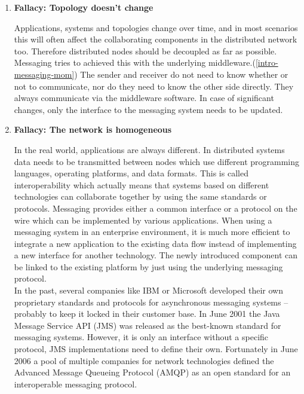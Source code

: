 \begin{enumerate}
{      }

    \item{\textbf{Fallacy: Topology doesn't change}

        Applications, systems and topologies change over time, and in most
        scenarios this will often affect the collaborating components in the
        distributed network too. Therefore distributed nodes should be decoupled
        as far as possible. Messaging tries to achieved this with the underlying
        middleware.(\ref{intro-messaging-mom}) The sender and receiver do not need
        to know whether or not to communicate, nor do they need to know the other 
        side directly. They always communicate via the middleware software. In 
        case of significant changes, only the interface to the messaging system 
        needs to be updated.

      }

    \item{\textbf{Fallacy: The network is homogeneous}

        In the real world, applications are always different. In distributed systems
        data needs to be transmitted between nodes which use different
        programming languages, operating platforms, and data formats.  This is
        called interoperability which actually means that systems based on
        different technologies can collaborate together by using the same
        standards or protocols. Messaging provides either a common interface or
        a protocol on the wire which can be implemented by various
        applications. When using a messaging system in an enterprise
        environment, it is much more efficient to integrate a new application to
        the existing data flow instead of implementing a new interface for
        another technology. The newly introduced component can be linked to the
        existing platform by just using the underlying messaging protocol.\\

        In the past, several companies like IBM or Microsoft developed their own
        proprietary standards and protocols for asynchronous messaging systems
        -- probably to keep it locked in their customer base. In June 2001 the
        Java Message Service API (JMS) was released as the best-known standard for
        messaging systems. However, it is only an interface without a specific
        protocol, JMS implementations need to define their own. Fortunately in
        June 2006 a pool of multiple companies for network technologies defined
        the Advanced Message Queueing Protocol (AMQP) as an open standard for an
        interoperable messaging protocol. \cite{PrpAMQP}

    }

\end{enumerate} \cite{EIP03}\cite{fallacies}

